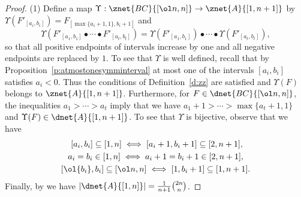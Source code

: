 \begin{proof}
  (1) Define a map
  $\Upsilon: \znet{BC}{[\ol n, n]} \rightarrow \znet{A}{[1, n+1]}$ by
  $\Upsilon(F'_{[a_i,b_i]}) = F_{[\max\{a_i+1,1\},b_i+1]}$ and
  \begin{equation*}
      \Upsilon(F'_{[a_1,b_1]} \bullet \cdots \bullet F'_{[a_t,b_t]})
      =
    \Upsilon(F'_{[a_1, b_1]}) \bullet \cdots \bullet \Upsilon(F'_{[a_t,b_t]}),
  \end{equation*}
  so that all positive endpoints of intervals increase by one
  and all negative endpoints are replaced by $1$.
  To see that $\Upsilon$ is well defined, recall
  that by Proposition~\ref{p:atmostonesymminterval}
  at most one of the intervals $[a_i,b_i]$ satisfies $a_i < 0$.
  Thus the conditions of Definition~\ref{d:zz} are satisfied
  and $\Upsilon(F)$ belongs to $\znet{A}{[1,n+1]}$.
  Furthermore, for $F \in \dnet{BC}{[\ol n, n]}$,
  the inequalities $a_1 > \cdots > a_t$ imply that we have
  $a_1 + 1 > \cdots > \max\{a_t + 1, 1\}$ and
  $\Upsilon(F) \in \dnet{A}{[1,n+1]}$.
  To see that $\Upsilon$ is bijective, observe that we have
  \begin{equation*}
  \begin{gathered}
    \;[a_i,b_i] \subseteq [1,n] \;\Longleftrightarrow\;
      [a_i+1,b_i+1] \subseteq [2,n+1],\\
  a_i = b_i \in [1,n] \;\Longleftrightarrow\; a_i+1 = b_i+1 \in [2,n+1], \\
  [\ol{b_i},b_i] \subseteq [\ol n, n] \;\Longleftrightarrow\;
  [1,b_i+1] \subseteq [1,n+1].
  \end{gathered}
\end{equation*}
  Finally, by \cite[Thm.\,3.6]{CHSSkanEKL} we have
  $|\dnet{A}{[1,n]}| = \tfrac 1{n+1} \tbinom{2n}n$.
\end{proof}



